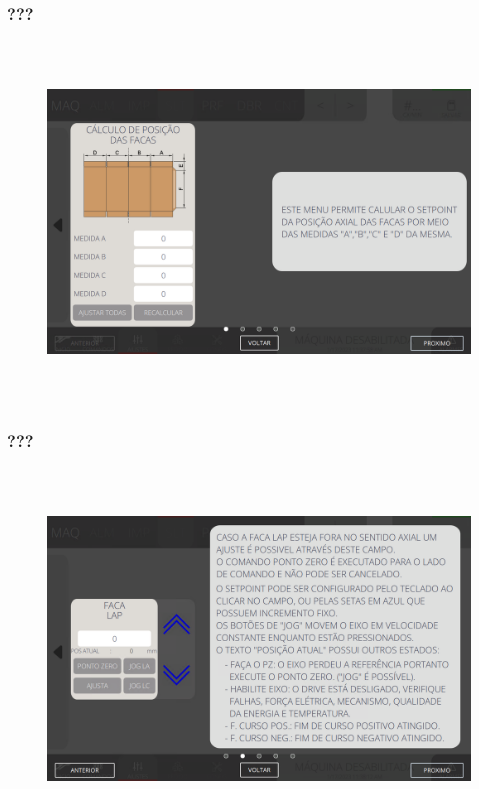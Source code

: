 \newpage
\thispagestyle{fancy}
\vspace*{\fill}
\subsubsection{\small{???}}
\begin{figure}[h]
  \centering
  \includegraphics[width=576px,height=360px]{src/imagesFlexo/05-slotter/settings/e-7.png}
   \label{}
\end{figure}
\vspace*{\fill}

\newpage
\thispagestyle{fancy}
\vspace*{\fill}
\subsubsection{\small{???}}
\begin{figure}[h]
  \centering
  \includegraphics[width=576px,height=360px]{src/imagesFlexo/05-slotter/settings/e-8.png}
   \label{}
\end{figure}
\vspace*{\fill}

